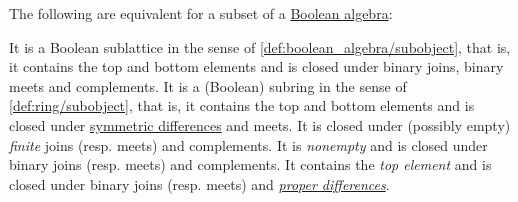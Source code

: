 \begin{proposition}\label{thm:boolean_subalgebra}
  The following are equivalent for a subset of a \hyperref[def:boolean_algebra]{Boolean algebra}:
  \begin{thmenum}
     It is a Boolean sublattice in the sense of \cref{def:boolean_algebra/subobject}, that is, it contains the top and bottom elements and is closed under binary joins, binary meets and complements.
     It is a (Boolean) subring in the sense of \cref{def:ring/subobject}, that is, it contains the top and bottom elements and is closed under \hyperref[def:symmetric_difference]{symmetric differences} and meets.
     It is closed under (possibly empty) \emph{finite} joins (resp. meets) and complements.
     It is \emph{nonempty} and is closed under binary joins (resp. meets) and complements.
     It contains the \emph{top element} and is closed under binary joins (resp. meets) and \hyperref[def:boolean_algebra_difference]{\emph{proper differences}}.
  \end{thmenum}
\end{proposition}

